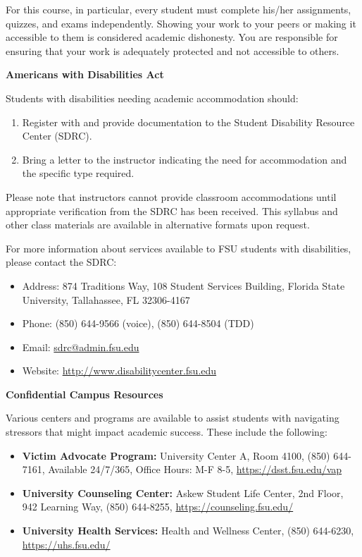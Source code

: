 For this course, in particular, every student must complete his/her assignments, quizzes, and exams independently. Showing your work to your peers or making it accessible to them is considered academic dishonesty. You are responsible for ensuring that your work is adequately protected and not accessible to others.

\vspace{\baselineskip}

\textbf{Americans with Disabilities Act}

Students with disabilities needing academic accommodation should:
\begin{enumerate}
    \item Register with and provide documentation to the Student Disability Resource Center (SDRC).
    \item Bring a letter to the instructor indicating the need for accommodation and the specific type required.
\end{enumerate}

Please note that instructors cannot provide classroom accommodations until appropriate verification from the SDRC has been received. This syllabus and other class materials are available in alternative formats upon request.

For more information about services available to FSU students with disabilities, please contact the SDRC:

\begin{itemize}
    \item Address: 874 Traditions Way, 108 Student Services Building, Florida State University, Tallahassee, FL 32306-4167
    \item Phone: (850) 644-9566 (voice), (850) 644-8504 (TDD)
    \item Email: \href{mailto:sdrc@admin.fsu.edu}{sdrc@admin.fsu.edu}
    \item Website: \url{http://www.disabilitycenter.fsu.edu}
\end{itemize}

\vspace{\baselineskip}

\textbf{Confidential Campus Resources}

Various centers and programs are available to assist students with navigating stressors that might impact academic success. These include the following:

\begin{itemize}
    \item \textbf{Victim Advocate Program:} University Center A, Room 4100, (850) 644-7161, Available 24/7/365, Office Hours: M-F 8-5, \url{https://dsst.fsu.edu/vap}
    \item \textbf{University Counseling Center:} Askew Student Life Center, 2nd Floor, 942 Learning Way, (850) 644-8255, \url{https://counseling.fsu.edu/}
    \item \textbf{University Health Services:} Health and Wellness Center, (850) 644-6230, \url{https://uhs.fsu.edu/}
\end{itemize}

